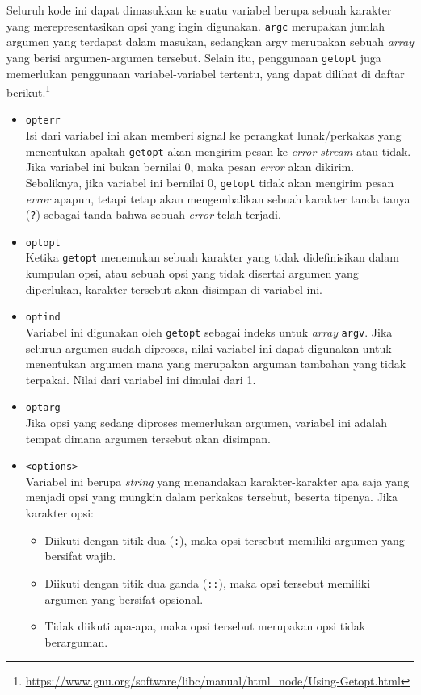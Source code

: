 Seluruh kode ini dapat dimasukkan ke suatu variabel berupa sebuah karakter yang merepresentasikan opsi yang ingin digunakan. \verb|argc| merupakan jumlah argumen yang terdapat dalam masukan, sedangkan argv merupakan sebuah \textit{array} yang berisi argumen-argumen tersebut.
\newline\newline
Selain itu, penggunaan \verb|getopt| juga memerlukan penggunaan variabel-variabel tertentu, yang dapat dilihat di daftar berikut.\footnote{\href{https://www.gnu.org/software/libc/manual/html\_node/Using-Getopt.html}{https://www.gnu.org/software/libc/manual/html\_node/Using-Getopt.html}}
\begin{itemize}
	\item \verb|opterr|\\
	Isi dari variabel ini akan memberi signal ke perangkat lunak/perkakas yang menentukan apakah \verb|getopt| akan mengirim pesan ke \textit{error stream} atau tidak. Jika variabel ini bukan bernilai 0, maka pesan \textit{error} akan dikirim. Sebaliknya, jika variabel ini bernilai 0, \verb|getopt| tidak akan mengirim pesan \textit{error} apapun, tetapi tetap akan mengembalikan sebuah karakter tanda tanya (\verb|?|) sebagai tanda bahwa sebuah \textit{error} telah terjadi.
	\item \verb|optopt|\\
	Ketika \verb|getopt| menemukan sebuah karakter yang tidak didefinisikan dalam kumpulan opsi, atau sebuah opsi yang tidak disertai argumen yang diperlukan, karakter tersebut akan disimpan di variabel ini.
	\item \verb|optind|\\
	Variabel ini digunakan oleh \verb|getopt| sebagai indeks untuk \textit{array} \verb|argv|. Jika seluruh argumen sudah diproses, nilai variabel ini dapat digunakan untuk menentukan argumen mana yang merupakan arguman tambahan yang tidak terpakai. Nilai dari variabel ini dimulai dari 1.
	\item \verb|optarg|\\
	Jika opsi yang sedang diproses memerlukan argumen, variabel ini adalah tempat dimana argumen tersebut akan disimpan.
	\item \verb|<options>|\\
	Variabel ini berupa \textit{string} yang menandakan karakter-karakter apa saja yang menjadi opsi yang mungkin dalam perkakas tersebut, beserta tipenya. Jika karakter opsi:
	
	\begin{itemize}
		\item Diikuti dengan titik dua (\verb|:|), maka opsi tersebut memiliki argumen yang bersifat wajib.
		\item Diikuti dengan titik dua ganda (\verb|::|), maka opsi tersebut memiliki argumen yang bersifat opsional.
		\item Tidak diikuti apa-apa, maka opsi tersebut merupakan opsi tidak berarguman.
	\end{itemize}
	
\end{itemize}

